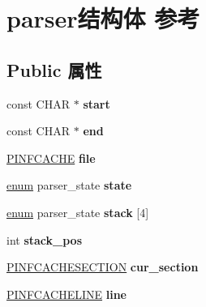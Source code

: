 \hypertarget{structparser}{}\section{parser结构体 参考}
\label{structparser}
\subsection*{Public 属性}
\begin{DoxyCompactItemize}
\item 
\mbox{\label{structparser_aa9d146e3ca1036f3ec9749e50c5d42e5}} 
const C\+H\+AR $\ast$ {\bfseries start}
\item 
\mbox{\label{structparser_a564a72bf77f7616cfd486d61c892573a}} 
const C\+H\+AR $\ast$ {\bfseries end}
\item 
\mbox{\label{structparser_ae73063c2fdf40efa3cbba0c9dc463428}} 
\hyperlink{struct___i_n_f_c_a_c_h_e}{P\+I\+N\+F\+C\+A\+C\+HE} {\bfseries file}
\item 
\mbox{\label{structparser_a79665d13094f0a29f7bec18af91a12de}} 
\hyperlink{interfaceenum}{enum} parser\+\_\+state {\bfseries state}
\item 
\mbox{\label{structparser_abcc4d72e5f14169f3ae12b13d90ccdd0}} 
\hyperlink{interfaceenum}{enum} parser\+\_\+state {\bfseries stack} \mbox{[}4\mbox{]}
\item 
\mbox{\label{structparser_a299dfa7edd0874533cc39067352cd739}} 
int {\bfseries stack\+\_\+pos}
\item 
\mbox{\label{structparser_a22a8b4f93c98fbf354f7f0ab4778c2fa}} 
\hyperlink{struct___i_n_f_c_a_c_h_e_s_e_c_t_i_o_n}{P\+I\+N\+F\+C\+A\+C\+H\+E\+S\+E\+C\+T\+I\+ON} {\bfseries cur\+\_\+section}
\item 
\mbox{\label{structparser_aeb03398a3c5f44d693cf5ae9149e7253}} 
\hyperlink{struct___i_n_f_c_a_c_h_e_l_i_n_e}{P\+I\+N\+F\+C\+A\+C\+H\+E\+L\+I\+NE} {\bfseries line}
\item 
\mbox{\label{structparser_a0c5fdae9db882010fea575e38aa45aca}} 

\end{DoxyCompactItemize}
